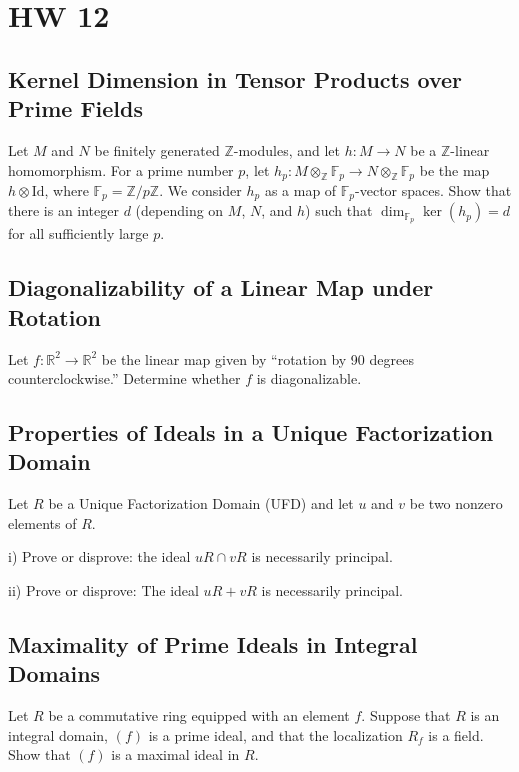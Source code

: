\documentclass[lang=cn,11pt]{template}
\begin{document}
\chapter{HW 12}

\section{Kernel Dimension in Tensor Products over Prime Fields}
Let \( M \) and \( N \) be finitely generated \( \mathbb{Z} \)-modules, and let \( h : M \rightarrow N \) be a \( \mathbb{Z} \)-linear homomorphism. For a prime number \( p \), let \( h_p : M \otimes_{\mathbb{Z}} \mathbb{F}_p \rightarrow N \otimes_{\mathbb{Z}} \mathbb{F}_p \) be the map \( h \otimes \text{Id} \), where \( \mathbb{F}_p = \mathbb{Z}/p\mathbb{Z} \). We consider \( h_p \) as a map of \( \mathbb{F}_p \)-vector spaces. Show that there is an integer \( d \) (depending on \( M \), \( N \), and \( h \)) such that \( \dim_{\mathbb{F}_p} \ker(h_p) = d \) for all sufficiently large \( p \).

\section{Diagonalizability of a Linear Map under Rotation}
Let \( f : \mathbb{R}^2 \rightarrow \mathbb{R}^2 \) be the linear map given by “rotation by 90 degrees counterclockwise.” Determine whether \( f \) is diagonalizable.

\section{Properties of Ideals in a Unique Factorization Domain}
Let \( R \) be a Unique Factorization Domain (UFD) and let \( u \) and \( v \) be two nonzero elements of \( R \).

i) Prove or disprove: the ideal \( uR \cap vR \) is necessarily principal.

ii) Prove or disprove: The ideal \( uR + vR \) is necessarily principal.

\section{Maximality of Prime Ideals in Integral Domains}
Let \( R \) be a commutative ring equipped with an element \( f \). Suppose that \( R \) is an integral domain, \( (f) \) is a prime ideal, and that the localization \( R_f \) is a field. Show that \( (f) \) is a maximal ideal in \( R \).
\end{document}
